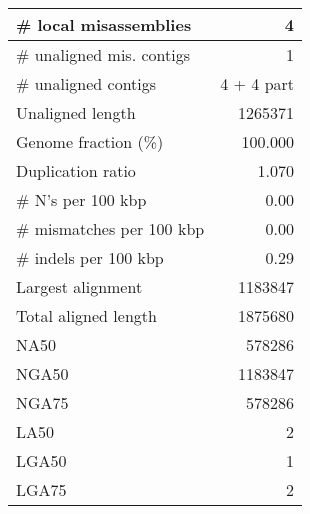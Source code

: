 \documentclass[12pt,a4paper]{article}
\begin{document}
\begin{table}[ht]
\begin{center}
\begin{tabular}{|l*{1}{|r}|}
\# local misassemblies & 4 \\ \hline
\# unaligned mis. contigs & 1 \\ \hline
\# unaligned contigs & 4 + 4 part \\ \hline
Unaligned length & 1265371 \\ \hline
Genome fraction (\%) & 100.000 \\ \hline
Duplication ratio & 1.070 \\ \hline
\# N's per 100 kbp & 0.00 \\ \hline
\# mismatches per 100 kbp & 0.00 \\ \hline
\# indels per 100 kbp & 0.29 \\ \hline
Largest alignment & 1183847 \\ \hline
Total aligned length & 1875680 \\ \hline
NA50 & 578286 \\ \hline
NGA50 & 1183847 \\ \hline
NGA75 & 578286 \\ \hline
LA50 & 2 \\ \hline
LGA50 & 1 \\ \hline
LGA75 & 2 \\ \hline
\end{tabular}
\end{center}
\end{table}
\end{document}
